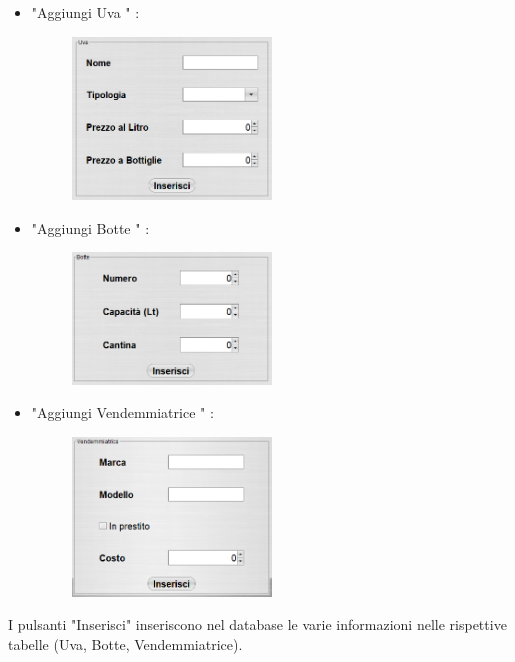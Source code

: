\documentclass{article}
\begin{document}
\begin{itemize}
\item "Aggiungi Uva " :\\
\begin{figure}[htbp]
\centering
\includegraphics[width=0.5\textwidth]{img/panel_uva.png}
\end{figure}
\newpage
\item "Aggiungi Botte " :\\
\begin{figure}[htbp]
\centering
\includegraphics[width=0.5\textwidth]{img/panel_botte.png}
\end{figure}
\item "Aggiungi Vendemmiatrice " :\\
\begin{figure}[htbp]
\centering
\includegraphics[width=0.5\textwidth]{img/panel_vendemmiatrice.png}
\end{figure}
\end{itemize}
I pulsanti "Inserisci" inseriscono nel database le varie informazioni nelle rispettive tabelle (Uva, Botte, Vendemmiatrice).\\
\newpage
\end{document}
